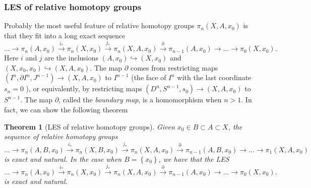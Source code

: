 \documentclass[reqno]{amsart}
\newtheorem{theorem}{Theorem}[section]
\theoremstyle{definition}
\theoremstyle{remark}
\begin{document}
  \subsubsection{LES of relative homotopy groups}
  Probably the most useful feature of relative homotopy
  groups $\pi_n (X,A,x_0)$ is that they 
  fit into a long exact sequence
  \[
  \ldots \to \pi_n (A,x_0)
  \stackrel{i_*}{\to} \pi_n(X,x_0)
  \stackrel{j_*}{\to} \pi_n (X,A,x_0)
  \stackrel{\partial}{\to} \pi_{n-1}(A,x_0) \to 
  \ldots \to \pi_0 (X,x_0).
  \] 
  Here $i$ and $j$ are the inclusions
  $\left( A, x_0 \right) \hookrightarrow
  (X,x_0)$ and
  $\left( X, x_0, x_0 \right) \hookrightarrow
  \left( X,A,x_0 \right) $. The map
  $\partial$ comes from restricting maps
  $\left( I^{n},\partial I^{n}, J^{n-1} \right) \to 
  \left( X,A,x_0 \right) $ to
  $I^{n-1}$ (the face of $I^{n}$ with the last
  coordinate $s_n = 0$ ),
  or equivalently, by restricting maps
  $\left( D^{n},S^{n-1},s_0 \right) \to 
  \left( X,A,x_0 \right) $ to $S^{n-1}$. The map $\partial$,
  called the \textit{boundary map}, is a homomorphism
  when $n>1$. In fact, we can show the following theorem

  \begin{theorem}[LES of relative homotopy groups]
      Given 
      $x_0 \in B \subset A \subset X$,
      the sequence of relative homotopy groups
  \[
      \ldots \to 
      \pi_n \left( A,B, x_0 \right) 
      \stackrel{i_*}{\to} 
      \pi_n \left( X, B, x_0 \right) 
      \stackrel{j_*}{\to} 
      \pi_n (X, A, x_0)
      \stackrel{\partial}{\to} 
      \pi_{n-1} \left( A,B, x_0 \right) 
      \to \ldots \to 
      \pi_1 (X,A,x_0)
  \] 
  is exact and natural.
  In the case when $B = \left\{ x_0 \right\} $, we have that
  the LES
  \[
  \ldots \to \pi_n (A,x_0)
  \stackrel{i_*}{\to} \pi_n(X,x_0)
  \stackrel{j_*}{\to} \pi_n (X,A,x_0)
  \stackrel{\partial}{\to} \pi_{n-1}(A,x_0) \to 
  \ldots \to \pi_0 (X,x_0).
  \] 
  is exact and natural.
  \end{theorem}
\end{document}
